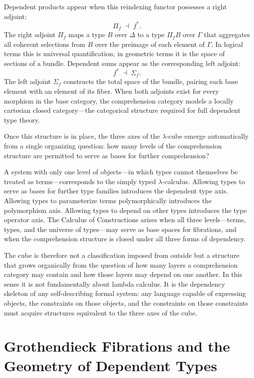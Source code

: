 \documentclass[12pt,a4paper]{article}
\theoremstyle{plain}
\theoremstyle{definition}
\begin{document}
Dependent products appear when this reindexing functor possesses a right adjoint:
\[
\Pi_f \;\dashv\; f^*.
\]
The right adjoint $\Pi_f$ maps a type $B$ over $\Delta$ to a type $\Pi_f B$ over $\Gamma$ that aggregates all coherent selections from $B$ over the preimage of each element of $\Gamma$. In logical terms this is universal quantification; in geometric terms it is the space of sections of a bundle. Dependent sums appear as the corresponding left adjoint:
\[
f^* \;\dashv\; \Sigma_f.
\]
The left adjoint $\Sigma_f$ constructs the total space of the bundle, pairing each base element with an element of its fiber. When both adjoints exist for every morphism in the base category, the comprehension category models a locally cartesian closed category---the categorical structure required for full dependent type theory.

Once this structure is in place, the three axes of the $\lambda$-cube emerge automatically from a single organizing question: how many levels of the comprehension structure are permitted to serve as bases for further comprehension? 

A system with only one level of objects---in which types cannot themselves be treated as terms---corresponds to the simply typed $\lambda$-calculus. Allowing types to serve as bases for further type families introduces the dependent type axis. Allowing types to parameterize terms polymorphically introduces the polymorphism axis. Allowing types to depend on other types introduces the type operator axis. The Calculus of Constructions arises when all three levels---terms, types, and the universe of types---may serve as base spaces for fibrations, and when the comprehension structure is closed under all three forms of dependency.

The cube is therefore not a classification imposed from outside but a structure that grows organically from the question of how many layers a comprehension category may contain and how those layers may depend on one another. In this sense it is not fundamentally about lambda calculus. It is the dependency skeleton of any self-describing formal system: any language capable of expressing objects, the constraints on those objects, and the constraints on those constraints must acquire structures equivalent to the three axes of the cube.

\section{Grothendieck Fibrations and the Geometry of Dependent Types}
\end{document}
